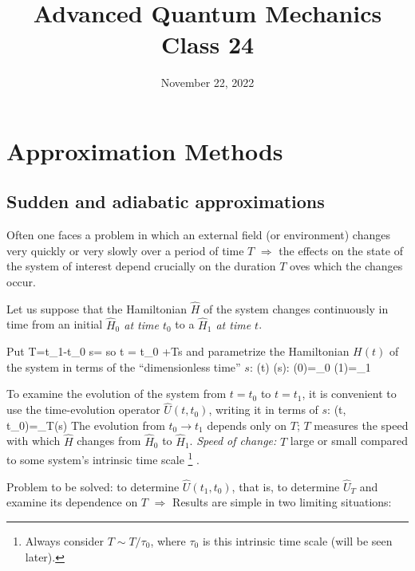 \documentclass[12pt]{article}
\title{Advanced Quantum Mechanics\\Class 24}
\date{November 22, 2022}                                           %
\begin{document}
\maketitle

\setcounter{section}{6}

\section{Approximation Methods}


\setcounter{subsection}{2}
\subsection{Sudden and adiabatic approximations}

Often one faces a problem in which an
external field (or environment) changes
very quickly or very slowly over a
period of time $T$
$\Rightarrow$
the effects on the state of the system of
interest depend crucially on the
duration $T$ oves which the changes occur.

Let us suppose that the Hamiltonian $\hat{H}$ of the
system changes continuously in time from an
initial \emph{$\hat{H}_{0}$ at time $t_{0}$} to a \emph{$\hat{H}_{1}$ at time $t$}.

Put
\be
T=t_{1}-t_{0}  s=
\ee
so
\be
t = t_0  +Ts
\ee
and parametrize the Hamiltonian $H(t)$ of the system
in terms of the ``dimensionless time'' $s$:
\be
{}(t) \rightarrow {}(s): (0)=_{0}  (1)=_{1}
\ee


To examine the evolution of the system from $t=t_{0}$
to $t=t_{1}$, it is convenient to use the time-evolution
operator $\hat{U}\left(t, t_{0}\right)$, writing it in terms of $s$:
\be
{}\left(t, t_{0}\right)=_{T}(s)
\ee
The evolution from $t_{0} \rightarrow t_{1}$ depends only on $T$;
$T$ measures the speed with which $\hat{H}$ changes from $\hat{H}_{0}$ to $\hat{H}_{1}$.
\emph{Speed of change:} $T$ large or small compared to some
system's intrinsic time scale%
\footnote{Always consider $T\sim T/\tau_0$, where $\tau_0$ is this intrinsic time scale (will be seen later).}%
.

Problem to be solved: to determine $\hat{U}\left(t_{1}, t_{0}\right)$,
that is, to determine $\hat{U}_{T}$ and examine its dependence on $T$
$\Rightarrow$ Results are simple in two limiting situations:
\end{document}
